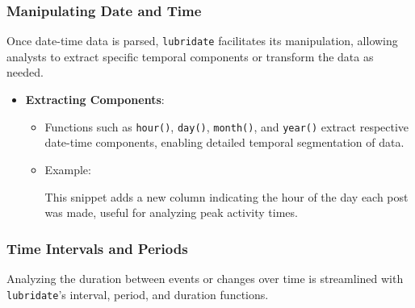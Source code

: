 \documentclass[
]{book}
\newenvironment{Shaded}{\begin{snugshade}}{\end{snugshade}}
\newcommand{\FunctionTok}[1]{\textcolor[rgb]{0.13,0.29,0.53}{\textbf{#1}}}
\newcommand{\NormalTok}[1]{#1}
\newcommand{\OtherTok}[1]{\textcolor[rgb]{0.56,0.35,0.01}{#1}}
\newcommand{\SpecialCharTok}[1]{\textcolor[rgb]{0.81,0.36,0.00}{\textbf{#1}}}
\providecommand{\tightlist}{%
  \setlength{\itemsep}{0pt}\setlength{\parskip}{0pt}}
\begin{document}
\hypertarget{manipulating-date-and-time}{%
\subsubsection{Manipulating Date and Time}\label{manipulating-date-and-time}}

Once date-time data is parsed, \texttt{lubridate} facilitates its manipulation, allowing analysts to extract specific temporal components or transform the data as needed.

\begin{itemize}
\tightlist
\item
  \textbf{Extracting Components}:

  \begin{itemize}
  \item
    Functions such as \texttt{hour()}, \texttt{day()}, \texttt{month()}, and \texttt{year()} extract respective date-time components, enabling detailed temporal segmentation of data.
  \item
    Example:

\begin{Shaded}
\end{Shaded}

    This snippet adds a new column indicating the hour of the day each post was made, useful for analyzing peak activity times.
  \end{itemize}
\end{itemize}

\hypertarget{time-intervals-and-periods}{%
\subsubsection{Time Intervals and Periods}\label{time-intervals-and-periods}}

Analyzing the duration between events or changes over time is streamlined with \texttt{lubridate}'s interval, period, and duration functions.
\end{document}
